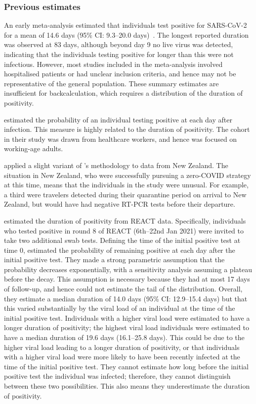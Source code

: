 \documentclass[thesis.tex]{subfiles}
\begin{document}
\subsubsection{Previous estimates}

An early meta-analysis estimated that individuals test positive for SARS-CoV-2 for a mean of 14.6 days (95\% CI: 9.3--20.0 days)~\autocite{cevikShedding}.
The longest reported duration was observed at 83 days, although beyond day 9 no live virus was detected, indicating that the individuals testing positive for longer than this were not infectious.
However, most studies included in the meta-analysis involved hospitalised patients or had unclear inclusion criteria, and hence may not be representative of the general population.
These summary estimates are insufficient for backcalculation, which requires a distribution of the duration of positivity.

\Textcite{hellewellPCRSensitivity} estimated the probability of an individual testing positive at each day after infection.
This measure is highly related to the duration of positivity.
The cohort in their study was drawn from healthcare workers, and hence was focused on working-age adults.

\Textcite{binnySensitivity} applied a slight variant of \textcite{hellewellPCRSensitivity}'s methodology to data from New Zealand.
The situation in New Zealand, who were successfully pursuing a zero-COVID strategy at this time, means that the individuals in the study were unusual.
For example, a third were travelers detected during their quarantine period on arrival to New Zealand, but would have had negative RT-PCR tests before their departure.

\Textcite{ealesCharacterising} estimated the duration of positivity from REACT data.
Specifically, individuals who tested positive in round 8 of REACT (6th--22nd Jan 2021) were invited to take two additional swab tests.
Defining the time of the initial positive test at time 0, \textcite{ealesCharacterising} estimated the probability of remaining positive at each day after the initial positive test.
They made a strong parametric assumption that the probability decreases exponentially, with a sensitivity analysis assuming a plateau before the decay.
This assumption is necessary because they had at most 17 days of follow-up, and hence could not estimate the tail of the distribution.
Overall, they estimate a median duration of 14.0 days (95\% CI: 12.9--15.4 days) but that this varied substantially by the viral load of an individual at the time of the initial positive test.
Individuals with a higher viral load were estimated to have a longer duration of positivity; the highest viral load individuals were estimated to have a median duration of 19.6 days (16.1--25.8 days).
This could be due to the higher viral load leading to a longer duration of positivity, or that individuals with a higher viral load were more likely to have been recently infected at the time of the initial positive test.
They cannot estimate how long before the initial positive test the individual was infected; therefore, they cannot distinguish between these two possibilities.
This also means they underestimate the duration of positivity.
\end{document}

